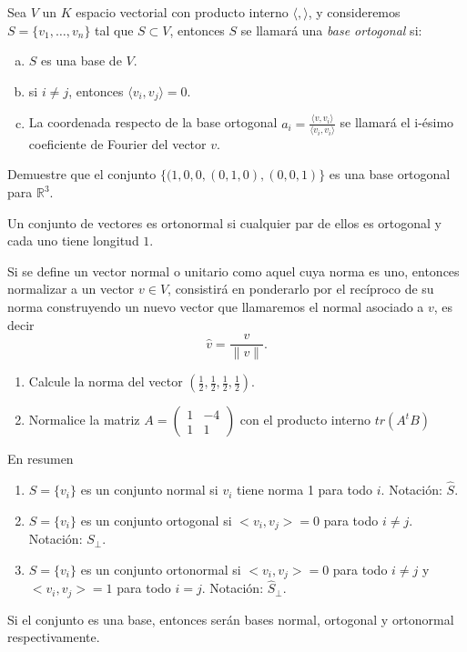 \begin{defin}
Sea $V$ un $K$ espacio vectorial con producto interno $\langle ,  \rangle$, y consideremos $S = \{v_1, \dots, v_n\}$ tal que $S\subset V$, entonces $S$ se llamará una \emph{base ortogonal} si:
\begin{enumerate}[(a)]
    \item $S$ es una base de $V$.
    \item si $i \neq j$, entonces $\langle v_i, v_j \rangle=0$.
    \item La coordenada respecto de la base ortogonal $a_i=\frac{\langle v, v_i \rangle}{\langle v_i, v_i \rangle}$ se llamará el i-ésimo coeficiente de Fourier del vector $v$.
\end{enumerate}

\end{defin}
\begin{ejer}

Demuestre que el conjunto $\{( 1 , 0 , 0 , ( 0 , 1 , 0), ( 0 , 0, 1)\}$ es una base ortogonal para $\mathbb{R}^3$.

\end{ejer}


\begin{defin}
Un conjunto de vectores es ortonormal si cualquier par de ellos es ortogonal y cada uno tiene longitud $1$.
\end{defin}

Si se define un vector normal o unitario como aquel cuya norma es uno, entonces normalizar
a un vector $v\in V$, consistirá en ponderarlo por el recíproco de su norma construyendo un
nuevo vector que llamaremos el normal asociado a $v$, es decir
\[\hat{v}=\frac{v}{\|v\|}.\]
\begin{ejer}
\begin{enumerate}
    \item Calcule la norma del vector $\left(\frac{1}{2},\frac{1}{2},\frac{1}{2},\frac{1}{2}\right)$.

    \item Normalice la matriz $A=\begin{pmatrix} 1 &-4 \\ 1&1 \end{pmatrix}$ con el producto interno $tr(A^tB)$
\end{enumerate}
\end{ejer}

\begin{defin} En resumen
\begin{enumerate}
    \item $S=\{v_i\}$ es un conjunto normal si $v_i$ tiene norma 1 para todo $i$. Notaci\'on: $\hat{S}$.
    \item $S=\{v_i\}$ es un conjunto ortogonal si $<v_i,v_j>=0$ para todo $i\neq j$. Notaci\'on: ${S}_\perp$.
    \item $S=\{v_i\}$ es un conjunto ortonormal si $<v_i,v_j>=0$ para todo $i\neq j$ y  $<v_i,v_j>=1$ para todo $i= j$. Notaci\'on: $\hat{S}_\perp$.
\end{enumerate}
Si el conjunto es una base, entonces serán bases normal, ortogonal y ortonormal respectivamente.
\end{defin}

